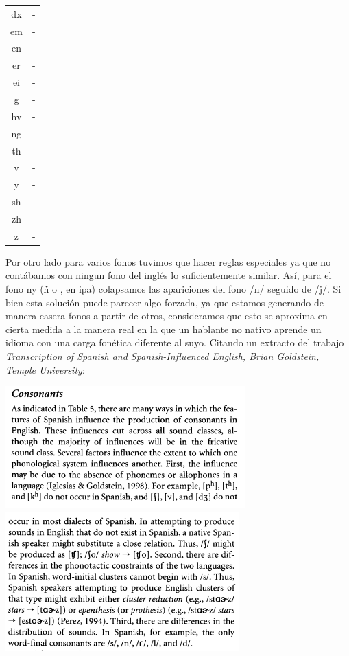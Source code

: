 \begin{table}
\begin{minipage}[t]{0.3\textwidth}
\begin{tabular}[t]{c|c}
dx & -\\  
em & -\\  
en & -\\  
er & -\\  
ei & -\\  
g & -\\  
hv & -\\  
ng & -\\  
th & -\\  
v & -\\  
y & -\\  
sh & -\\  
zh & -\\  
z  & -\\  
\bottomrule
\end{tabular}
\end{minipage}
\end{table}

Por otro lado para varios fonos tuvimos que hacer reglas especiales ya que no contábamos con ningun fono del inglés lo suficientemente similar. Así,  para el fono ny (ñ o \textltailn, en ipa) colapsamos las apariciones del fono /n/ seguido de /j/. Si bien esta solución puede parecer algo forzada, ya que estamos generando de manera casera fonos a partir de otros, consideramos que esto se aproxima en cierta medida a la manera real en la que un hablante no nativo aprende un idioma con una carga fonética diferente al suyo. Citando un extracto del trabajo \textit{Transcription of Spanish and Spanish-Influenced English, Brian Goldstein, Temple University}\cite{spanishInfluencedEnglish}:

\begin{center}
\includegraphics[scale=0.6]{imagenes_investigacion/consonantes1.png}
\includegraphics[scale=0.6]{imagenes_investigacion/consonantes2.png}
\end{center}

